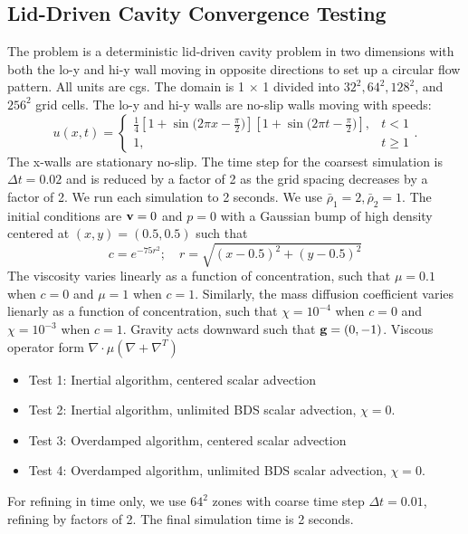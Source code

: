 \documentclass[final]{siamltex}
\def\gb {{\bf g}}
\def\vb {{\bf v}}
\begin{document}
\subsection{Lid-Driven Cavity Convergence Testing}
The problem is a deterministic lid-driven cavity problem in two dimensions with 
both the lo-y and hi-y wall moving in opposite directions to set up a circular 
flow pattern.  All units are cgs.
The domain is 1 $\times$ 1 divided into $32^2, 64^2, 128^2$, and $256^2$
grid cells.  The lo-y and hi-y walls are no-slip walls moving with speeds:
\begin{equation}
u(x,t) =
\begin{cases}
\frac{1}{4}\left[1 + \sin{(2\pi x - \frac{\pi}{2}})\right]
           \left[1 + \sin{(2\pi t - \frac{\pi}{2}})\right], & t < 1\\
1, & t \ge 1
\end{cases}.
\end{equation}
The x-walls are stationary no-slip.  The time step for the coarsest simulation is
$\Delta t = 0.02$ and is reduced by a factor of 2 as the grid spacing
decreases by a factor of 2.  We run each simulation to 2 seconds.
We use $\bar\rho_1 = 2, \bar\rho_2 = 1$.  The initial conditions are $\vb=0$ 
and $p=0$ with
a Gaussian bump of high density centered at $(x,y) = (0.5, 0.5)$ such that
\begin{equation}
c = e^{-75r^2}; \quad r = \sqrt{(x-0.5)^2 + (y-0.5)^2}
\end{equation}
The viscosity varies linearly as a function of concentration, such that $\mu=0.1$
when $c=0$ and $\mu=1$ when $c=1$.  Similarly, the mass diffusion coefficient
varies lienarly as a function of concentration, such that $\chi=10^{-4}$ when $c=0$ and
$\chi=10^{-3}$ when $c=1$.  Gravity acts downward such that $\gb=(0,-1)$.
Viscous operator form $\nabla\cdot\mu(\nabla + \nabla^T)$
\begin{itemize}
\item Test 1: Inertial algorithm, centered scalar advection
\item Test 2: Inertial algorithm, unlimited BDS scalar advection, $\chi=0$.
\item Test 3: Overdamped algorithm, centered scalar advection
\item Test 4: Overdamped algorithm, unlimited BDS scalar advection, $\chi=0$.
\end{itemize}
For refining in time only, we use $64^2$ zones with coarse time step $\Delta t = 0.01$, refining
by factors of 2.  The final simulation time is 2 seconds.
\end{document}
